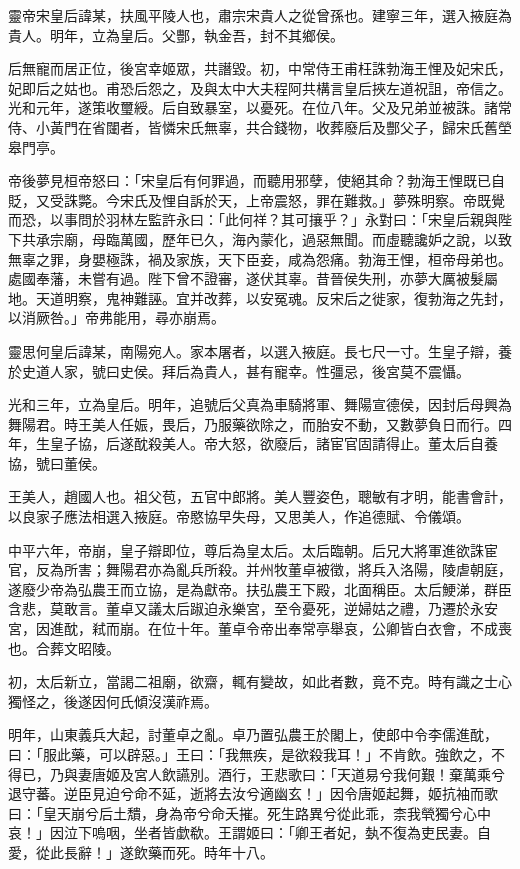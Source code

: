 \begin{pinyinscope}
靈帝宋皇后諱某，扶風平陵人也，肅宗宋貴人之從曾孫也。建寧三年，選入掖庭為貴人。明年，立為皇后。父酆，執金吾，封不其鄉侯。

后無寵而居正位，後宮幸姬眾，共譖毀。初，中常侍王甫枉誅勃海王悝及妃宋氏，妃即后之姑也。甫恐后怨之，及與太中大夫程阿共構言皇后挾左道祝詛，帝信之。光和元年，遂策收璽綬。后自致暴室，以憂死。在位八年。父及兄弟並被誅。諸常侍、小黃門在省闥者，皆憐宋氏無辜，共合錢物，收葬廢后及酆父子，歸宋氏舊塋皋門亭。

帝後夢見桓帝怒曰：「宋皇后有何罪過，而聽用邪孽，使絕其命？勃海王悝既已自貶，又受誅斃。今宋氏及悝自訴於天，上帝震怒，罪在難救。」夢殊明察。帝既覺而恐，以事問於羽林左監許永曰：「此何祥？其可攘乎？」永對曰：「宋皇后親與陛下共承宗廟，母臨萬國，歷年已久，海內蒙化，過惡無聞。而虛聽讒妒之說，以致無辜之罪，身嬰極誅，禍及家族，天下臣妾，咸為怨痛。勃海王悝，桓帝母弟也。處國奉藩，未嘗有過。陛下曾不證審，遂伏其辜。昔晉侯失刑，亦夢大厲被髮屬地。天道明察，鬼神難誣。宜并改葬，以安冤魂。反宋后之徙家，復勃海之先封，以消厥咎。」帝弗能用，尋亦崩焉。

靈思何皇后諱某，南陽宛人。家本屠者，以選入掖庭。長七尺一寸。生皇子辯，養於史道人家，號曰史侯。拜后為貴人，甚有寵幸。性彊忌，後宮莫不震懾。

光和三年，立為皇后。明年，追號后父真為車騎將軍、舞陽宣德侯，因封后母興為舞陽君。時王美人任娠，畏后，乃服藥欲除之，而胎安不動，又數夢負日而行。四年，生皇子協，后遂酖殺美人。帝大怒，欲廢后，諸宦官固請得止。董太后自養協，號曰董侯。

王美人，趙國人也。祖父苞，五官中郎將。美人豐姿色，聰敏有才明，能書會計，以良家子應法相選入掖庭。帝愍協早失母，又思美人，作追德賦、令儀頌。

中平六年，帝崩，皇子辯即位，尊后為皇太后。太后臨朝。后兄大將軍進欲誅宦官，反為所害；舞陽君亦為亂兵所殺。并州牧董卓被徵，將兵入洛陽，陵虐朝庭，遂廢少帝為弘農王而立協，是為獻帝。扶弘農王下殿，北面稱臣。太后鯁涕，群臣含悲，莫敢言。董卓又議太后踧迫永樂宮，至令憂死，逆婦姑之禮，乃遷於永安宮，因進酖，弒而崩。在位十年。董卓令帝出奉常亭舉哀，公卿皆白衣會，不成喪也。合葬文昭陵。

初，太后新立，當謁二祖廟，欲齋，輒有變故，如此者數，竟不克。時有識之士心獨怪之，後遂因何氏傾沒漢祚焉。

明年，山東義兵大起，討董卓之亂。卓乃置弘農王於閣上，使郎中令李儒進酖，曰：「服此藥，可以辟惡。」王曰：「我無疾，是欲殺我耳！」不肯飲。強飲之，不得已，乃與妻唐姬及宮人飲讌別。酒行，王悲歌曰：「天道易兮我何艱！棄萬乘兮退守蕃。逆臣見迫兮命不延，逝將去汝兮適幽玄！」因令唐姬起舞，姬抗袖而歌曰：「皇天崩兮后土穨，身為帝兮命夭摧。死生路異兮從此乖，柰我煢獨兮心中哀！」因泣下嗚咽，坐者皆歔欷。王謂姬曰：「卿王者妃，埶不復為吏民妻。自愛，從此長辭！」遂飲藥而死。時年十八。


\end{pinyinscope}
